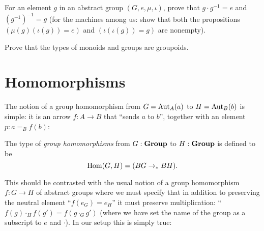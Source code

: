   \begin{xca}
    For an element $g$ in an abstract group $(G,e,\mu,\iota)$, prove that $g\cdot g^{-1}=e$ and $(g^{-1})^{-1}=g$ (for the machines among us: show that both the propositions
$
(\mu{}(g)(\iota{}(g))=e)$ and $
(\iota{}(\iota{}(g))=g)$ are nonempty).
  \end{xca}
  \begin{xca}
    Prove that the types of monoids and groups are groupoids.
  \end{xca}



\section{Homomorphisms}
\label{sec:homomorphisms}


The notion of a group homomorphism from $G=\mathrm{Aut}_A(a)$ to $H=\mathrm{Aut}_B(b)$ is simple: it is an arrow $f:A\to B$ that ``sends $a$ to $b$'', \ie together with an element $p:a=_Bf(b)$:
\begin{definition}\label{def:grouphomomorphism}
  The type of \emph{group homomorphisms} from $G:\mathbf{Group}$ to $H:\mathbf{Group}$ is defined to be
$$\Hom(G,H)=(BG\to_* BH).%
$$
\end{definition}
This should be contrasted with the usual notion of a group homomorphism $f\colon G\to H$ of abstract groups where we must specify that in addition to preserving the neutral element ``$f(e_G)=e_H$'' it must preserve multiplication: ``$f(g)\cdot_H f(g')=f(g\cdot_G g')$ (where we have set the name of the group as a subscript to $e$ and $\cdot$).  In our setup this is simply true:

